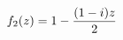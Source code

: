 \documentclass[preview]{standalone}
\begin{document}
\begin{align*}
\special{dvisvgm:raw <g id='unique000'>}f_2(z) = 1 - \frac{(1-i)z}{2}\special{dvisvgm:raw </g>}
\end{align*}
\end{document}
